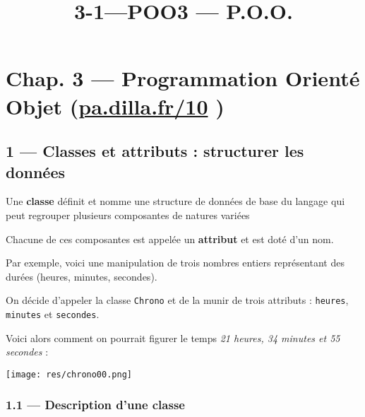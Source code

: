 \documentclass[a4paper,17pt]{extarticle}
\title{3-1---POO}
\begin{document}
    
    \title{3 --- P.O.O.}

    
    

    
    \hypertarget{chap.-3-programmation-orientuxe9-objet-pa.dilla.fr10}{%
\section{\texorpdfstring{Chap. 3 --- Programmation Orienté Objet
(\href{https://pa.dilla.fr/10}{pa.dilla.fr/10}
)}{Chap. 3 --- Programmation Orienté Objet (pa.dilla.fr/10 )}}\label{chap.-3-programmation-orientuxe9-objet-pa.dilla.fr10}}

    \hypertarget{classes-et-attributs-structurer-les-donnuxe9es}{%
\subsection{1 --- Classes et attributs : structurer les
données}\label{classes-et-attributs-structurer-les-donnuxe9es}}
\begin{retenir}
    Une \textbf{classe} définit et nomme une structure de données de base du
langage qui peut regrouper plusieurs composantes de natures variées

        \end{retenir}\begin{retenir}
    Chacune de ces composantes est appelée un \textbf{attribut} et est doté
d'un nom.

        \end{retenir}\begin{exemple}
    Par exemple, voici une manipulation de trois nombres entiers
représentant des durées (heures, minutes, secondes).

On décide d'appeler la classe \texttt{Chrono} et de la munir de trois
attributs : \texttt{heures}, \texttt{minutes} et \texttt{secondes}.

Voici alors comment on pourrait figurer le temps \emph{21 heures, 34
minutes et 55 secondes} :

\texttt{[image: res/chrono00.png]}

        \end{exemple}
    \hypertarget{description-dune-classe}{%
\subsubsection{1.1 --- Description d'une
classe}\label{description-dune-classe}}
\end{document}
